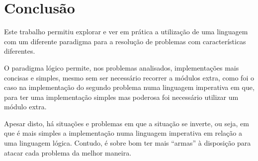 \documentclass[12pt,a4paper,oneside]{article}
\begin{document}

\section{Conclusão}
\label{sec:conc}

Este trabalho permitiu explorar e ver em prática a utilização de uma linguagem com um
diferente paradigma para a resolução de problemas com características diferentes.

O paradigma lógico permite, nos problemas analisados, implementações mais concisas e
simples, mesmo sem ser necessário recorrer a módulos extra, como foi o caso na implementação
do segundo problema numa linguagem imperativa em que, para ter uma implementação simples
mas poderosa foi necessário utilizar um módulo extra.

Apesar disto, há situações e problemas em que a situação se inverte, ou seja, em que é mais
simples a implementação numa linguagem imperativa em relação a uma linguagem lógica. Contudo,
é sobre bom ter mais ``armas'' à disposição para atacar cada problema da melhor maneira.




\end{document}
